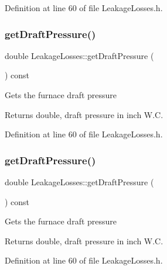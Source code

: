 Definition at line 60 of file Leakage\+Losses.\+h.

\mbox{\label{class_leakage_losses_a0ec89fc6371c4a788e1bb861c7cfba35}} 
\subsubsection{\texorpdfstring{get\+Draft\+Pressure()}{getDraftPressure()}\hspace{0.1cm}{\footnotesize\ttfamily [2/3]}}
{\footnotesize\ttfamily double Leakage\+Losses\+::get\+Draft\+Pressure (\begin{DoxyParamCaption}{ }\end{DoxyParamCaption}) const\hspace{0.3cm}{\ttfamily [inline]}}

Gets the furnace draft pressure \begin{DoxyReturn}{Returns}
double, draft pressure in inch W.\+C. 
\end{DoxyReturn}


Definition at line 60 of file Leakage\+Losses.\+h.

\mbox{\label{class_leakage_losses_a0ec89fc6371c4a788e1bb861c7cfba35}} 
\subsubsection{\texorpdfstring{get\+Draft\+Pressure()}{getDraftPressure()}\hspace{0.1cm}{\footnotesize\ttfamily [3/3]}}
{\footnotesize\ttfamily double Leakage\+Losses\+::get\+Draft\+Pressure (\begin{DoxyParamCaption}{ }\end{DoxyParamCaption}) const\hspace{0.3cm}{\ttfamily [inline]}}

Gets the furnace draft pressure \begin{DoxyReturn}{Returns}
double, draft pressure in inch W.\+C. 
\end{DoxyReturn}


Definition at line 60 of file Leakage\+Losses.\+h.

